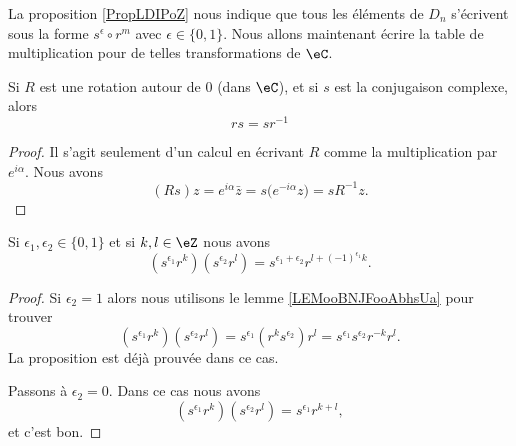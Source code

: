 La proposition \ref{PropLDIPoZ} nous indique que tous les éléments de \( D_n\) s'écrivent sous la forme \( s^{\epsilon}\circ r^m\) avec \( \epsilon\in\{ 0,1 \}\). Nous allons maintenant écrire la table de multiplication pour de telles transformations de \( \eC\).

\begin{lemma}       \label{LEMooBNJFooAbhsUa}
    Si \( R\) est une rotation autour de \( 0\) (dans \( \eC\)), et si \( s\) est la conjugaison complexe, alors
    \begin{equation}
        rs=sr^{-1}
    \end{equation}
\end{lemma}

\begin{proof}
    Il s'agit seulement d'un calcul en écrivant \( R\) comme la multiplication par \(  e^{i\alpha}\). Nous avons
    \begin{equation}
        (Rs)z= e^{i\alpha}\bar z=s\big(  e^{-i\alpha}z \big)=sR^{-1}z.
    \end{equation}
\end{proof}

\begin{proposition}     \label{PROPooPYDLooLgiUjk}
    Si \( \epsilon_1,\epsilon_2\in\{ 0,1 \}\) et si \( k,l\in \eZ\) nous avons
    \begin{equation}
        (s^{\epsilon_1}r^k)(s^{\epsilon_2}r^l)=s^{\epsilon_1+\epsilon_2}r^{l+(-1)^{\epsilon_1}k}.
    \end{equation}
\end{proposition}

\begin{proof}
    Si \( \epsilon_2=1\) alors nous utilisons le lemme \ref{LEMooBNJFooAbhsUa} pour trouver
    \begin{equation}
        (s^{\epsilon_1}r^k)(s^{\epsilon_2}r^l)=s^{\epsilon_1}(r^ks^{\epsilon_2})r^l=s^{\epsilon_1}s^{\epsilon_2}r^{-k}r^l.
    \end{equation}
    La proposition est déjà prouvée dans ce cas.

    Passons à \( \epsilon_2=0\). Dans ce cas nous avons
    \begin{equation}
        (s^{\epsilon_1}r^k)(s^{\epsilon_2}r^l)=s^{\epsilon_1}r^{k+l},
    \end{equation}
    et c'est bon.
\end{proof}

